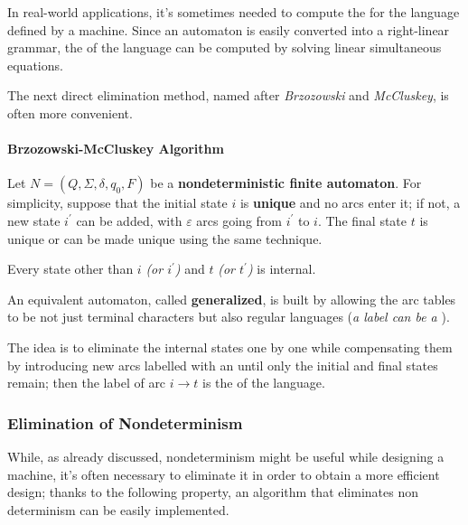 \documentclass[english]{article}
\begin{document}
In real-world applications, it's sometimes needed to compute the \re for the language defined by a machine.
Since an automaton is easily converted into a right-linear grammar, the \re of the language can be computed by solving linear simultaneous equations.

The next direct elimination method, named \BMC after \textit{Brzozowski} and \textit{McCluskey}, is often more convenient.

\paragraph{Brzozowski-McCluskey Algorithm}

\begin{definition}
  \label{def:brzozowski-mccluskey-algorithm}
  Let \(N = \left( Q, \Sigma, \delta, q_0, F \right)\) be a \textbf{nondeterministic finite automaton}.
  For simplicity, suppose that the initial state \(i\) is \textbf{unique} and no arcs enter it;
  if not, a new state \(i^\prime\) can be added, with \(\varepsilon\) arcs going from \(i^\prime\) to \(i\).
  The final state \(t\) is unique or can be made unique using the same technique.

  Every state other than \(i\) \textit{(or \(i^\prime\))} and \(t\) \textit{(or \(t^\prime\))} is internal.

  An equivalent automaton, called \textbf{generalized}, is built by allowing the arc tables to be not just terminal characters but also regular languages (\textit{a label can be a \re}).

  The idea is to eliminate the internal states one by one while compensating them by introducing new arcs labelled with an \re until only the initial and final states remain;
  then the label of arc \(i \rightarrow t\) is the \re of the language.
\end{definition}

\subsubsection{Elimination of Nondeterminism}
\label{sec:elimination-of-nondeterminism}

While, as already discussed, nondeterminism might be useful while designing a machine, it's often necessary to eliminate it in order to obtain a more efficient design;
thanks to the following property, an algorithm that eliminates non determinism can be easily implemented.
\end{document}
